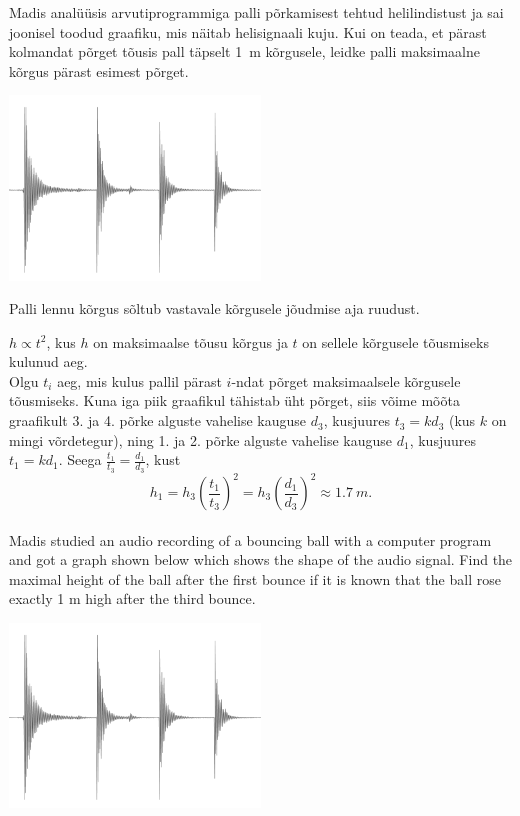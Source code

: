 
Madis analüüsis arvutiprogrammiga palli põrkamisest tehtud helilindistust
ja sai joonisel toodud graafiku, mis näitab helisignaali kuju.
Kui on teada, et pärast kolmandat põrget tõusis pall täpselt \SI{1}{m} kõrgusele,
leidke palli maksimaalne kõrgus pärast esimest põrget.
\begin{center}
\includegraphics[width=0.5\textwidth]{2013-v3g-02-pall}%
\end{center}

\hint
Palli lennu kõrgus sõltub vastavale kõrgusele jõudmise aja ruudust.

\solu
$h \propto t^{2}$, kus $h$ on maksimaalse tõusu kõrgus ja $t$ on sellele kõrgusele tõusmiseks kulunud aeg.\\
Olgu $t_{i}$ aeg, mis kulus pallil pärast $i$-ndat põrget maksimaalsele kõrgusele tõusmiseks. Kuna iga piik graafikul tähistab üht põrget, siis võime mõõta graafikult 3. ja 4. põrke alguste vahelise kauguse $d_{3}$, kusjuures $t_{3}=kd_{3}$ (kus $k$ on mingi võrdetegur), ning 1. ja 2. põrke alguste vahelise kauguse $d_{1}$, kusjuures $t_{1}=kd_{1}$. Seega 
$\frac{t_{1}}{t_{3}}=\frac{d_{1}}{d_{3}}$, kust
$$h_{1}=h_{3}\left(\frac{t_{1}}{t_{3}}\right)^{2}=h_{3}\left(\frac{d_{1}}{d_{3}}\right)^{2} \approx \SI{1,7}{m}.$$\\

Madis studied an audio recording of a bouncing ball with a computer program and got a graph shown below which shows the shape of the audio signal. Find the maximal height of the ball after the first bounce if it is known that the ball rose exactly 1 m high after the third bounce.
\begin{center}
\includegraphics[width=0.5\textwidth]{2013-v3g-02-pall}%
\end{center}

